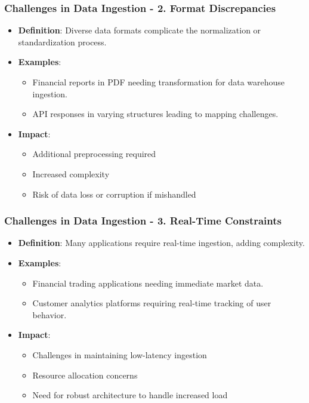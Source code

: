 \documentclass{beamer}
\begin{document}
\begin{frame}[fragile]
    \frametitle{Challenges in Data Ingestion - 2. Format Discrepancies}
    \begin{itemize}
        \item \textbf{Definition}: Diverse data formats complicate the normalization or standardization process.
        \item \textbf{Examples}:
            \begin{itemize}
                \item Financial reports in PDF needing transformation for data warehouse ingestion.
                \item API responses in varying structures leading to mapping challenges.
            \end{itemize}
        \item \textbf{Impact}:
            \begin{itemize}
                \item Additional preprocessing required
                \item Increased complexity
                \item Risk of data loss or corruption if mishandled
            \end{itemize}
    \end{itemize}
\end{frame}

\begin{frame}[fragile]
    \frametitle{Challenges in Data Ingestion - 3. Real-Time Constraints}
    \begin{itemize}
        \item \textbf{Definition}: Many applications require real-time ingestion, adding complexity.
        \item \textbf{Examples}:
            \begin{itemize}
                \item Financial trading applications needing immediate market data.
                \item Customer analytics platforms requiring real-time tracking of user behavior.
            \end{itemize}
        \item \textbf{Impact}:
            \begin{itemize}
                \item Challenges in maintaining low-latency ingestion
                \item Resource allocation concerns 
                \item Need for robust architecture to handle increased load
            \end{itemize}
    \end{itemize}
\end{frame}
\end{document}
